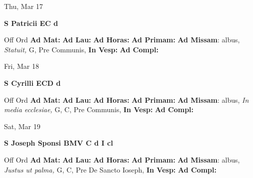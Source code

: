 \documentclass[10pt]{book}
\begin{document}
\begin{center}
\begin{minipage}{3.5in}
\vspace{2em}
\begin{center}Thu, Mar 17
\end{center}
\textbf{ \large S Patricii EC
\textnormal{\normalsize d}}

\begin{justify}Off Ord
\textbf{Ad Mat: }
\textbf{Ad Lau: }
\textbf{Ad Horas: }
\textbf{Ad Primam: }\textbf{Ad Missam}: albus, \textit{Statuit,} G, Pre Communis, 
\textbf{In Vesp: }
\textbf{Ad Compl: }
\end{justify}
\end{minipage}
\end{center}

\begin{center}
\begin{minipage}{3.5in}
\vspace{2em}
\begin{center}Fri, Mar 18
\end{center}
\textbf{ \large S Cyrilli ECD
\textnormal{\normalsize d}}

\begin{justify}Off Ord
\textbf{Ad Mat: }
\textbf{Ad Lau: }
\textbf{Ad Horas: }
\textbf{Ad Primam: }\textbf{Ad Missam}: albus, \textit{In media ecclesiae,} G, C, Pre Communis, 
\textbf{In Vesp: }
\textbf{Ad Compl: }
\end{justify}
\end{minipage}
\end{center}

\begin{center}
\begin{minipage}{3.5in}
\vspace{2em}
\begin{center}Sat, Mar 19
\end{center}
\textbf{ \large S Joseph Sponsi BMV C
\textnormal{\normalsize d I cl}}

\begin{justify}Off Ord
\textbf{Ad Mat: }
\textbf{Ad Lau: }
\textbf{Ad Horas: }
\textbf{Ad Primam: }\textbf{Ad Missam}: albus, \textit{Justus ut palma,} G, C, Pre De Sancto Ioseph, 
\textbf{In Vesp: }
\textbf{Ad Compl: }
\end{justify}
\end{minipage}
\end{center}
\end{document}
